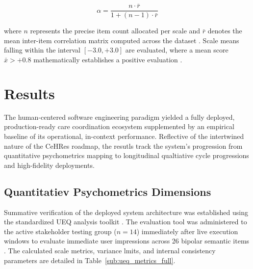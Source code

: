 \documentclass[manuscript, screen, review]{acmart}
\begin{document}
$$\alpha = \frac{n \cdot \bar{r}}{1 + (n - 1) \cdot \bar{r}}$$

where $n$ represents the precise item count allocated per scale and $\bar{r}$ denotes the mean inter-item correlation matrix computed across the dataset \cite{schrepp_2023_user}. Scale means falling within the interval $[-3.0, +3.0]$ are evaluated, where a mean score $\bar{x} > +0.8$ mathematically establishes a positive evaluation \cite{schrepp_2023_user}.


\section{Results}
\label{sec:results}

The human-centered software engineering paradigm yielded a fully deployed, production-ready care coordination ecosystem supplemented by an empirical baseline of its operational, in-context performance. Reflective of the intertwined nature of the CeHRes roadmap, the resutls track the system's progression from quantitative psychometrics mapping to longitudinal qualtiative cycle progressions and high-fidelity deployments. 

\subsection{Quantitatiev Psychometrics Dimensions}
\label{sub:ueq_findings}

Summative verification of the deployed system architecture was established using the standardized UEQ analysis toolkit \cite{laugwitz_2008_construction,hinderks_user}. The evaluation tool was administered to the active stakeholder testing group ($n=14$) immediately after live execution windows to evaluate immediate user impressions across 26 bipolar semantic items \cite{laugwitz_2008_construction,schrepp_2023_user}. The calculated scale metrics, variance lmits, and internal consistency parameters are detailed in Table~\ref{sub:ueq_metrics_full}.
\end{document}
